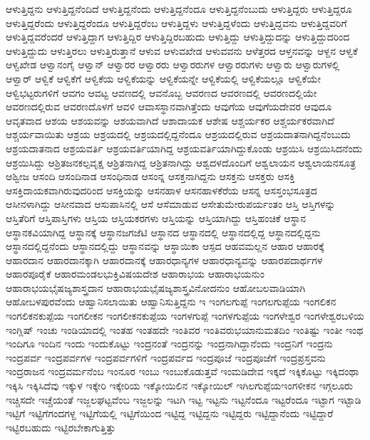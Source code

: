 {ಆಳುತ್ತಿದ್ದನು
ಆಳುತ್ತಿದ್ದನೆಂದಿದೆ
ಆಳುತ್ತಿದ್ದನೆಂದು
ಆಳುತ್ತಿದ್ದನೆಂದೂ
ಆಳುತ್ತಿದ್ದನೆಂಬುದು
ಆಳುತ್ತಿದ್ದರು
ಆಳುತ್ತಿದ್ದರೂ
ಆಳುತ್ತಿದ್ದರೆಂದು
ಆಳುತ್ತಿದ್ದರೆಂದೂ
ಆಳುತ್ತಿದ್ದರೆಂಬ
ಆಳುತ್ತಿದ್ದಳು
ಆಳುತ್ತಿದ್ದಳೆಂದು
ಆಳುತ್ತಿದ್ದವನು
ಆಳುತ್ತಿದ್ದವರಿಗೆ
ಆಳುತ್ತಿದ್ದವರೆಂದರೆ
ಆಳುತ್ತಿದ್ದಾಗ
ಆಳುತ್ತಿದ್ದಿರ
ಆಳುತ್ತಿದ್ದಿರಬಹುದು
ಆಳುತ್ತಿದ್ದು
ಆಳುತ್ತಿದ್ದುದನ್ನು
ಆಳುತ್ತಿದ್ದುದರಿಂದ
ಆಳುತ್ತಿದ್ದುದು
ಆಳುತ್ತಿರಲು
ಆಳುತ್ತಿರುತ್ತಾನೆ
ಆಳುವ
ಆಳುವಖೇಡ
ಆಳುವವನು
ಆಳೆತ್ತರದ
ಆಳ್ತನವನ್ನು
ಆಳ್ದನ
ಆಳ್ವಕೆ
ಆಳ್ವಖೇಡ
ಆಳ್ವಾನಂಗೈ
ಆಳ್ವಾನ್
ಆಳ್ವಾರರ
ಆಳ್ವಾರರು
ಆಳ್ವಾರರುಗಳ
ಆಳ್ವಾರರುಗಳು
ಆಳ್ವಾರು
ಆಳ್ವಾರುಗಳಲ್ಲಿ
ಆಳ್ವಾರ್
ಆಳ್ವಿಕೆ
ಆಳ್ವಿಕೆಗೆ
ಆಳ್ವಿಕೆಯ
ಆಳ್ವಿಕೆಯನ್ನು
ಆಳ್ವಿಕೆಯನ್ನೇ
ಆಳ್ವಿಕೆಯಲ್ಲಿ
ಆಳ್ವಿಕೆಯಲ್ಲೂ
ಆಳ್ವಿಕೆಯೇ
ಆಳ್ವಿಭಟ್ಟರುಗಳಿಗೆ
ಆವಗಂ
ಆವಟ್ಟ
ಆವಣದಲ್ಲಿ
ಆವನೊಬ್ಬ
ಆವರಣದ
ಆವರಣದಲ್ಲಿ
ಆವರಣದಲ್ಲಿಯೇ
ಆವರಣದಲ್ಲಿರುವ
ಆವರಣದೊಳಗೆ
ಆವಳಿ
ಆವಾಸಸ್ಥಾನವಾಗಿತ್ತೆಂದು
ಆವುಗೆಯ
ಆವುಗೆಯದೇವರ
ಆವುದೂ
ಆವೃತವಾದ
ಆಶಯ
ಆಶಯವನ್ನು
ಆಶಯವಾಗಿದೆ
ಆಶಾದಾಯಕ
ಆಶೇಷ
ಆಶ್ಚರ್ಯಕರ
ಆಶ್ಚರ್ಯಕರವಾಗಿದೆ
ಆಶ್ಚರ್ಯವಾಯಿತು
ಆಶ್ರಯ
ಆಶ್ರಯದಲ್ಲಿ
ಆಶ್ರಯದಲ್ಲಿದ್ದನೆಂದೂ
ಆಶ್ರಯದಲ್ಲಿರುವ
ಆಶ್ರಯದಾತನಾಗಿದ್ದನೆಂಬುದು
ಆಶ್ರಯದಾತನಾದ
ಆಶ್ರಯವರ್ತಿ
ಆಶ್ರಯವರ್ತಿಯಾಗಿದ್ದ
ಆಶ್ರಯವರ್ತಿಯಾಗಿದ್ದುಕೊಂಡು
ಆಶ್ರಯಿಸಿ
ಆಶ್ರಯಿಸಿದನೆಂದು
ಆಶ್ರಯಿಸಿದ್ದು
ಆಶ್ರಿತಜನಕಲ್ಪವೃಕ್ಷ
ಆಶ್ರಿತನಾಗಿದ್ದ
ಆಶ್ರಿತನಾಗಿದ್ದು
ಆಶ್ವದಳದೊಂದಿಗೆ
ಆಶ್ವಲಾಯನ
ಆಶ್ವಲಾಯನಸೂತ್ರ
ಆಶ್ವೀಜ
ಆಸಂದಿ
ಆಸಂದಿನಾಡ
ಆಸಂಧಿನಾಡ
ಆಸಂನ್ನ
ಆಸಕ್ತನಾಗಿದ್ದನು
ಆಸಕ್ತನು
ಆಸಕ್ತರು
ಆಸಕ್ತಿ
ಆಸಕ್ತಿದಾಯಕವಾಗಿರುವುದರಿಂದ
ಆಸಕ್ತಿಯನ್ನು
ಆಸನಹಾಳ
ಆಸನಹಾಳಕೆರೆಯ
ಆಸನ್ನ
ಆಸಸ್ತಂಭಸೂತ್ರದ
ಆಸೀನಳಾಗಿದ್ದು
ಆಸೀನವಾದ
ಆಸುಪಾಸಿನಲ್ಲಿ
ಆಸೆ
ಆಸೆಮಾಡುವ
ಆಸೇತುಮೇರುಪರ್ಯಂತಂ
ಆಸ್ತಿ
ಆಸ್ತಿಗಳನ್ನು
ಆಸ್ತಿತೆರಿಗೆ
ಆಸ್ತಿಪಾಸ್ತಿಗಳು
ಆಸ್ತಿಯ
ಆಸ್ತಿಯಕರಗಳು
ಆಸ್ತಿಯನ್ನು
ಆಸ್ತಿಯಾಗಿದ್ದು
ಆಸ್ತಿಹಂಚಿಕೆ
ಆಸ್ಥಾನ
ಆಸ್ಥಾನಕವಿಯಾಗಿದ್ದ
ಆಸ್ಥಾನಕ್ಕೆ
ಆಸ್ಥಾನಜಗಜೆಟಿ
ಆಸ್ಥಾನದ
ಆಸ್ಥಾನದಲ್ಲಿ
ಆಸ್ಥಾನದಲ್ಲಿದ್ದ
ಆಸ್ಥಾನದಲ್ಲಿದ್ದನು
ಆಸ್ಥಾನದಲ್ಲಿದ್ದನೆಂದು
ಆಸ್ಥಾನದಲ್ಲಿದ್ದು
ಆಸ್ಥಾನವನ್ನು
ಆಸ್ಥಾಯಿಕಾ
ಆಸ್ಪದ
ಆಹವಮಲ್ಲನ
ಆಹಾರ
ಆಹಾರಕ್ಕೆ
ಆಹಾರದಾನ
ಆಹಾರದಾನಕ್ಕಾಗಿ
ಆಹಾರದಾನಕ್ಕೆ
ಆಹಾರಧಾನ್ಯಗಳ
ಆಹಾರಧಾನ್ಯವನ್ನು
ಆಹಾರಪದಾರ್ಥಗಳ
ಆಹಾರಪೂರೈಕೆ
ಆಹಾರಮಂಡಲಭುಕ್ತಿವಿಷಯದೇಶ
ಆಹಾರಾಭಯ
ಆಹಾರಾಭಯನುಂ
ಆಹಾರಾಭಯಭೈಷಜ್ಯಶಾಸ್ತ್ರದಾನ
ಆಹಾರಾಭಯಭೈಷಜ್ಯಶಾಸ್ತ್ರವಿನೋದನುಂ
ಆಹೋಬಲವಾಡಿಯಾಗಿ
ಆಹೋಬಳಪುರವೆಂದು
ಆಹ್ವಾನಿಸಲಾಯಿತು
ಆಹ್ವಾನಿಸುತ್ತಿದ್ದನು
ಇ
ಇಂಗಲಗುಪ್ಪೆ
ಇಂಗಲಗುಪ್ಪೆಯ
ಇಂಗಲಿಕನ
ಇಂಗಲಿಕನಕುಪ್ಪೆಯ
ಇಂಗಲೀಕನ
ಇಂಗಲೀಕನಕುಪ್ಪೆಯ
ಇಂಗಳಗುಪ್ಪೆ
ಇಂಗಳಗುಪ್ಪೆಯ
ಇಂಗಳೇಶ್ವರ
ಇಂಗಳೇಶ್ವರಬಳಿಯ
ಇಂಗ್ಲಿಷ್
ಇಂಚು
ಇಂಡಿಯಾದಲ್ಲಿ
ಇಂತಹ
ಇಂತಹದೇ
ಇಂತಿವರ
ಇಂತಿವರುಭಯಾನುಮತದಿಂ
ಇಂತಿಷ್ಟು
ಇಂತೀ
ಇಂಥ
ಇಂದಿಗೂ
ಇಂದಿನ
ಇಂದು
ಇಂದುಕೊಟ್ಟು
ಇಂದ್ರನಂತೆ
ಇಂದ್ರನನ್ನು
ಇಂದ್ರನಾಗಿದ್ದಾನೆಂದು
ಇಂದ್ರನಿಗೆ
ಇಂದ್ರನು
ಇಂದ್ರಪರ್ವ
ಇಂದ್ರಪರ್ವಗಳ
ಇಂದ್ರಪರ್ವಗಳಿಗೆ
ಇಂದ್ರಪರ್ವದ
ಇಂದ್ರಪೂಜೆ
ಇಂದ್ರಪೂಜೆಗೆ
ಇಂದ್ರಪ್ರಸ್ತವನು
ಇಂದ್ರರಾಜನ
ಇಂದ್ರವರ್ಮನೆಂಬ
ಇಂನೂರ
ಇಂಬು
ಇಂಬುಕೊಡುತ್ತವೆ
ಇಂಮಡಿದೇವ
ಇಕ್ಕದೆ
ಇಕ್ಕಿಕೊಟ್ಟು
ಇಕ್ಕಿದಂಥಾ
ಇಕ್ಕಿಸಿ
ಇಕ್ಕಿಸಿದೆವು
ಇಕ್ಕುಳ
ಇಕ್ಕೇರಿ
ಇಕ್ಕೇರಿಯ
ಇಕ್ಕೋಯಿಲಿನ
ಇಕ್ಕೋಯಿಲ್
ಇಗಿಲಗುಪ್ಪೆಯಇಂಗಳೀಕನ
ಇಗ್ಗಲೂರು
ಇಚ್ಚಿಸದೇ
ಇಚ್ಚೆಯಂತೆ
ಇಜ್ಜಲಘಟ್ಟವೆಂಬ
ಇಜ್ಜಲನ್ನು
ಇಟಗಿ
ಇಟ್ಟ
ಇಟ್ಟನು
ಇಟ್ಟನೆಂದೂ
ಇಟ್ಟರೆಂದೂ
ಇಟ್ಟಾಗ
ಇಟ್ಟಾಡಿ
ಇಟ್ಟಿಗೆ
ಇಟ್ಟಿಗೆಗಂದಗಳ್ದ
ಇಟ್ಟಿಗೆಯಲ್ಲಿ
ಇಟ್ಟಿಗೆಯಿಂದ
ಇಟ್ಟಿದ್ದ
ಇಟ್ಟಿದ್ದನು
ಇಟ್ಟಿದ್ದರು
ಇಟ್ಟಿದ್ದಾನೆಂದು
ಇಟ್ಟಿದ್ದಾರೆ
ಇಟ್ಟಿರಬಹುದು
ಇಟ್ಟಿರಬೇಕಾಗುತ್ತಿತ್ತು
}
